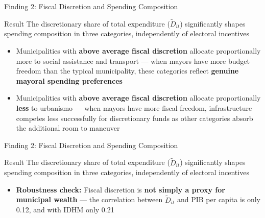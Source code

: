 \documentclass{beamer}
\begin{document}
\begin{frame}{Finding 2: Fiscal Discretion and Spending Composition}
\begin{block}{Result}
The discretionary share of total expenditure ($\tilde{D}_{it}$) significantly shapes spending composition in three categories, independently of electoral incentives
\end{block}
\vspace{1em}
\begin{itemize}
    \item Municipalities with \textbf{above average fiscal discretion} allocate proportionally more to social assistance and transport --- when mayors have more budget freedom than the typical municipality, these categories reflect \textbf{genuine mayoral spending preferences}
    \item Municipalities with \textbf{above average fiscal discretion} allocate proportionally \textbf{less} to urbanismo --- when mayors have more fiscal freedom, infrastructure competes less successfully for discretionary funds as other categories absorb the additional room to maneuver
\end{itemize}
\end{frame}


\begin{frame}{Finding 2: Fiscal Discretion and Spending Composition}
\begin{block}{Result}
The discretionary share of total expenditure ($\tilde{D}_{it}$) significantly shapes spending composition in three categories, independently of electoral incentives
\end{block}
\vspace{1em}
\begin{itemize}
    \item \textbf{Robustness check:} Fiscal discretion is \textbf{not simply a proxy for municipal wealth} --- the correlation between $\tilde{D}_{it}$ and PIB per capita is only 0.12, and with IDHM only 0.21
\end{itemize}
\end{frame}
\end{document}
